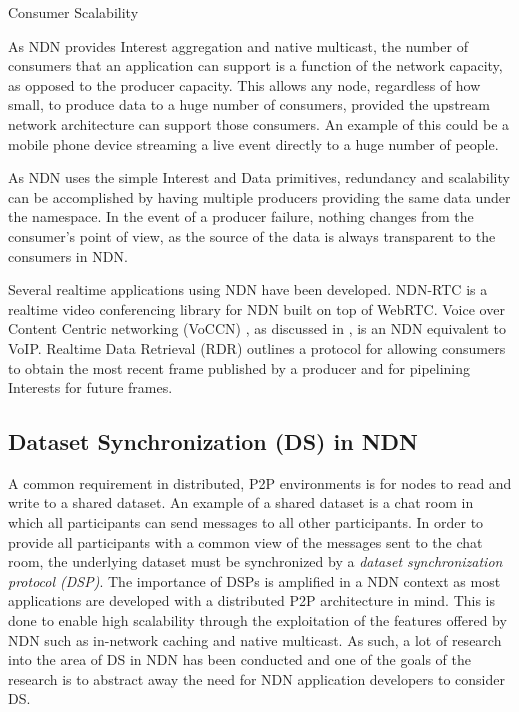 \begin{labeling}{Consumer Scalability }
    \item [Consumer Scalability] As NDN provides Interest aggregation and native multicast, the number of consumers that an application can support is a function of the network capacity, as opposed to the producer capacity. This allows any node, regardless of how small, to produce data to a huge number of consumers, provided the upstream network architecture can support those consumers. An example of this could be a mobile phone device streaming a live event directly to a huge number of people.
    \item [Producer Scalability] As NDN uses the simple Interest and Data primitives, redundancy and scalability can be accomplished by having multiple producers providing the same data under the namespace. In the event of a producer failure, nothing changes from the consumer's point of view, as the source of the data is always transparent to the consumers in NDN.
\end{labeling}

Several realtime applications using NDN have been developed. NDN-RTC \cite{ndn-rtc} is a realtime video conferencing library for NDN built on top of WebRTC. Voice over Content Centric networking (VoCCN) \cite{vj-voccn}, as discussed in , is an NDN equivalent to VoIP. Realtime Data Retrieval (RDR) \cite{realtime-data-retrieval} outlines a protocol for allowing consumers to obtain the most recent frame published by a producer and for pipelining Interests for future frames.


\subsection{Dataset Synchronization (DS) in NDN}\label{sec:dataset-sync}
A common requirement in distributed, P2P environments is for nodes to read and write to a shared dataset. An example of a shared dataset is a chat room in which all participants can send messages to all other participants. In order to provide all participants with a common view of the messages sent to the chat room, the underlying dataset must be synchronized by a  \textit{dataset synchronization protocol (DSP)}. The importance of DSPs is amplified in a NDN context as most applications are developed with a distributed P2P architecture in mind. This is done to enable high scalability through the exploitation of the features offered by NDN such as in-network caching and native multicast. As such, a lot of research into the area of DS in NDN has been conducted and one of the goals of the research is to abstract away the need for NDN application developers to consider DS.

